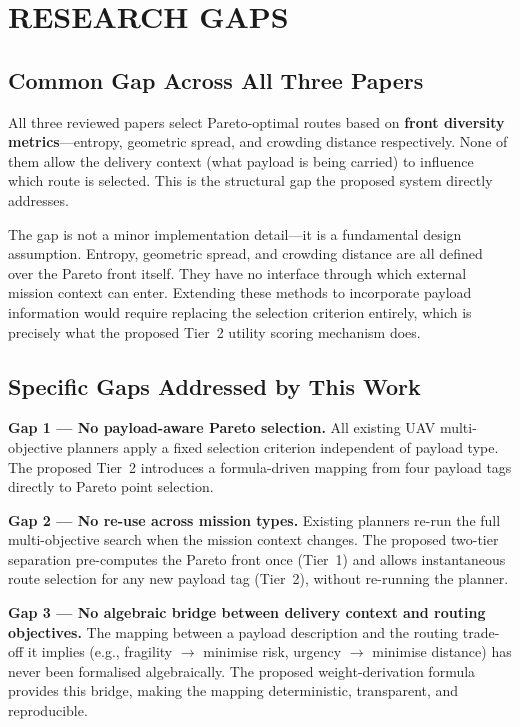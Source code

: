 \section{RESEARCH GAPS}

\subsection{Common Gap Across All Three Papers}

All three reviewed papers select Pareto-optimal routes based on \textbf{front diversity
metrics}---entropy, geometric spread, and crowding distance respectively. None of them
allow the delivery context (what payload is being carried) to influence which route is
selected. This is the structural gap the proposed system directly addresses.

The gap is not a minor implementation detail---it is a fundamental design assumption.
Entropy, geometric spread, and crowding distance are all defined over the Pareto front
itself. They have no interface through which external mission context can enter. Extending
these methods to incorporate payload information would require replacing the selection
criterion entirely, which is precisely what the proposed Tier~2 utility scoring mechanism
does.

\subsection{Specific Gaps Addressed by This Work}

\textbf{Gap 1 --- No payload-aware Pareto selection.} All existing UAV multi-objective
planners apply a fixed selection criterion independent of payload type. The proposed
Tier~2 introduces a formula-driven mapping from four payload tags directly to Pareto
point selection.

\textbf{Gap 2 --- No re-use across mission types.} Existing planners re-run the full
multi-objective search when the mission context changes. The proposed two-tier separation
pre-computes the Pareto front once (Tier~1) and allows instantaneous route selection for
any new payload tag (Tier~2), without re-running the planner.

\textbf{Gap 3 --- No algebraic bridge between delivery context and routing objectives.}
The mapping between a payload description and the routing trade-off it implies (e.g.,
fragility $\rightarrow$ minimise risk, urgency $\rightarrow$ minimise distance) has
never been formalised algebraically. The proposed weight-derivation formula provides this
bridge, making the mapping deterministic, transparent, and reproducible.
